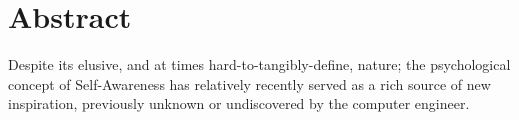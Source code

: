 \chapter*{Abstract}
\label{abstract}

Despite its elusive, and at times hard-to-tangibly-define, nature; the psychological concept of Self-Awareness has relatively recently served as a rich source of new inspiration, previously unknown or undiscovered by the computer engineer.
